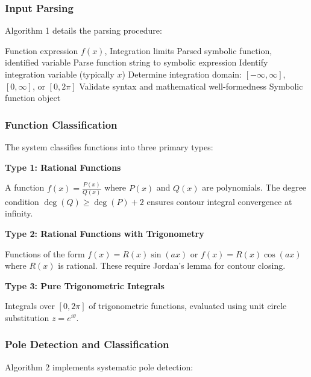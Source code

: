 \documentclass[conference]{IEEEtran}
\begin{document}
\subsubsection{Input Parsing}

Algorithm 1 details the parsing procedure:

\begin{algorithm}[h]
\caption{Input Parsing and Initialization}
\begin{algorithmic}[1]
\REQUIRE Function expression $f(x)$, Integration limits
\ENSURE Parsed symbolic function, identified variable
\STATE Parse function string to symbolic expression
\STATE Identify integration variable (typically $x$)
\STATE Determine integration domain: $[-\infty, \infty]$, $[0, \infty]$, or $[0, 2\pi]$
\STATE Validate syntax and mathematical well-formedness
\RETURN Symbolic function object
\end{algorithmic}
\end{algorithm}

\subsubsection{Function Classification}

The system classifies functions into three primary types:

\textbf{Type 1: Rational Functions}

A function $f(x) = \frac{P(x)}{Q(x)}$ where $P(x)$ and $Q(x)$ are polynomials. The degree condition $\deg(Q) \geq \deg(P) + 2$ ensures contour integral convergence at infinity.

\textbf{Type 2: Rational Functions with Trigonometry}

Functions of the form $f(x) = R(x) \sin(ax)$ or $f(x) = R(x) \cos(ax)$ where $R(x)$ is rational. These require Jordan's lemma for contour closing.

\textbf{Type 3: Pure Trigonometric Integrals}

Integrals over $[0, 2\pi]$ of trigonometric functions, evaluated using unit circle substitution $z = e^{i\theta}$.

\subsubsection{Pole Detection and Classification}

Algorithm 2 implements systematic pole detection:
\end{document}
